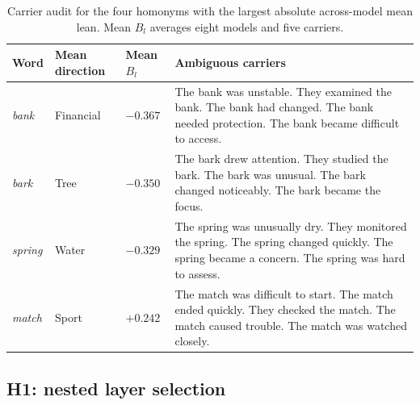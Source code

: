 \documentclass[conference]{IEEEtran}
\begin{document}
\begin{table}[!t]
\centering
\footnotesize
\caption{Carrier audit for the four homonyms with the largest absolute
across-model mean lean. Mean $B_l$ averages eight models and five carriers.}
\label{tab:h0-carrier-audit}
\begin{tabular}{p{}p{}p{}p{}}
\hline
Word & Mean direction & Mean $B_l$ & Ambiguous carriers \\
\hline

\emph{bank}
&
Financial
&
$-0.367$
&
The bank was unstable.\newline
They examined the bank.\newline
The bank had changed.\newline
The bank needed protection.\newline
The bank became difficult to access.
\\[0.5em]

\emph{bark}
&
Tree
&
$-0.350$
&
The bark drew attention.\newline
They studied the bark.\newline
The bark was unusual.\newline
The bark changed noticeably.\newline
The bark became the focus.
\\[0.5em]

\emph{spring}
&
Water
&
$-0.329$
&
The spring was unusually dry.\newline
They monitored the spring.\newline
The spring changed quickly.\newline
The spring became a concern.\newline
The spring was hard to assess.
\\[0.5em]

\emph{match}
&
Sport
&
$+0.242$
&
The match was difficult to start.\newline
The match ended quickly.\newline
They checked the match.\newline
The match caused trouble.\newline
The match was watched closely.
\\

\hline
\end{tabular}
\end{table}

\subsection{H1: nested layer selection}
\label{sec:results-h1}
\end{document}
